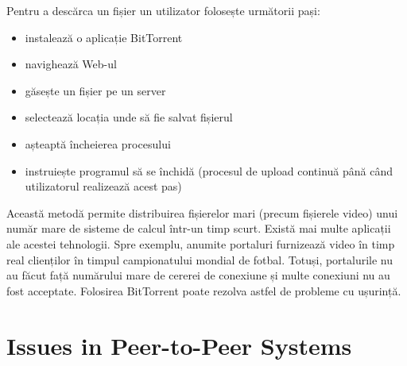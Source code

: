 Pentru a descărca un fișier un utilizator folosește următorii pași:

\begin{itemize}
  \item instalează o aplicație BitTorrent
  \item navighează Web-ul
  \item găsește un fișier pe un server
  \item selectează locația unde să fie salvat fișierul
  \item așteaptă încheierea procesului
  \item instruiește programul să se închidă (procesul de upload continuă până
  când utilizatorul realizează acest pas)
\end{itemize}

Această metodă permite distribuirea fișierelor mari (precum fișierele video)
unui număr mare de sisteme de calcul într-un timp scurt. Există mai multe
aplicații ale acestei tehnologii. Spre exemplu, anumite portaluri furnizează
video în timp real clienților în timpul campionatului mondial de fotbal.
Totuși, portalurile nu au făcut față numărului mare de cererei de conexiune și
multe conexiuni nu au fost acceptate. Folosirea BitTorrent poate rezolva
astfel de probleme cu ușurință.


\section{Issues in Peer-to-Peer Systems}
\label{sec:p2p-systems:issues}


